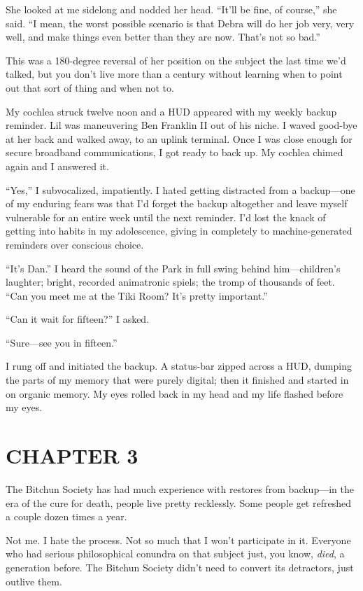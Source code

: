 She looked at me sidelong and nodded her head. “It'll be fine, of
course,” she said. “I mean, the worst possible scenario is that
Debra will do her job very, very well, and make things even better
than they are now. That's not so bad.”

This was a 180-degree reversal of her position on the subject the
last time we'd talked, but you don't live more than a century
without learning when to point out that sort of thing and when not
to.

My cochlea struck twelve noon and a HUD appeared with my weekly
backup reminder. Lil was maneuvering Ben Franklin II out of his
niche. I waved good-bye at her back and walked away, to an uplink
terminal. Once I was close enough for secure broadband
communications, I got ready to back up. My cochlea chimed again and
I answered it.

“Yes,” I subvocalized, impatiently. I hated getting distracted from
a backup—one of my enduring fears was that I'd forget the backup
altogether and leave myself vulnerable for an entire week until the
next reminder. I'd lost the knack of getting into habits in my
adolescence, giving in completely to machine-generated reminders
over conscious choice.

“It's Dan.” I heard the sound of the Park in full swing behind
him—children's laughter; bright, recorded animatronic spiels; the
tromp of thousands of feet. “Can you meet me at the Tiki Room? It's
pretty important.”

“Can it wait for fifteen?” I asked.

“Sure—see you in fifteen.”

I rung off and initiated the backup. A status-bar zipped across a
HUD, dumping the parts of my memory that were purely digital; then
it finished and started in on organic memory. My eyes rolled back
in my head and my life flashed before my eyes.

\section{CHAPTER 3}

The Bitchun Society has had much experience with restores from
backup—in the era of the cure for death, people live pretty
recklessly. Some people get refreshed a couple dozen times a year.

Not me. I hate the process. Not so much that I won't participate in
it. Everyone who had serious philosophical conundra on that subject
just, you know, \emph{died}, a generation before. The Bitchun
Society didn't need to convert its detractors, just outlive them.

